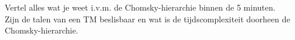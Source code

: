 \begin{question}
Vertel alles wat je weet i.v.m. de Chomsky-hierarchie binnen de 5 minuten. \\
Zijn de talen van een TM beslisbaar en wat is de tijdscomplexiteit doorheen de Chomsky-hierarchie.
\end{question}

